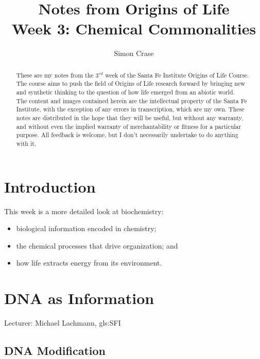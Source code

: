 \documentclass[]{article}
\title{
	Notes from Origins of Life\\
	Week 3: Chemical Commonalities
}
\author{Simon Crase}
\begin{document}
\maketitle

\begin{abstract}
 	These are my notes from the $3^{rd}$ week of the Santa Fe Institute Origins of Life Course\cite{sfi2020}. The course aims to push the field of Origins of Life research forward by bringing new and synthetic thinking to the question of how life emerged from an abiotic world.\\
  	The content and images contained herein are the intellectual property of the Santa Fe Institute, with the exception of any errors in transcription, which are my own.
  	These notes are distributed in the hope that they will be useful,
  	but without any warranty, and without even the implied warranty of
  	merchantability or fitness for a particular purpose. All feedback is welcome,
  	but I don't necessarily undertake to do anything with it.
\end{abstract}

\setcounter{tocdepth}{2}
\tableofcontents

\listoffigures
\listoftables

\section{Introduction}

This week is a more detailed look at biochemistry:\begin{itemize}
	\item  biological information encoded in chemistry;
	\item the chemical processes that drive organization; and
	\item  how life extracts energy from its environment.
\end{itemize}

\section{DNA as Information}
Lecturer: Michael Lachmann, \gls{gls:SFI}

\subsection{DNA Modification}
\end{document}
